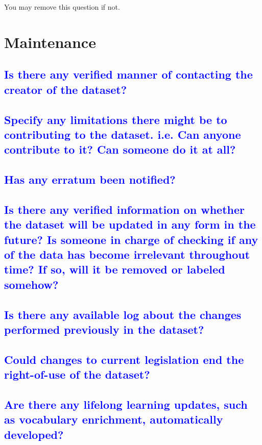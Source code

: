 \documentclass[letterpaper, 10 pt, conference]{ieeeconf}  %
\begin{document}
You may remove this question if not.
\\



\section{Maintenance}

\textcolor{blue}{\subsection{Is there any verified manner of contacting the creator of the dataset?}}
\lipsum[1]

\textcolor{blue}{\subsection{Specify any limitations there might be to contributing to the dataset. i.e. Can anyone contribute to it? Can someone do it at all?}}
\lipsum[1]

\textcolor{blue}{\subsection{Has any erratum been notified?}}
\lipsum[1]

\textcolor{blue}{\subsection{Is there any verified information on whether the dataset will be updated in any form in the future? Is someone in charge of checking if any of the data has become irrelevant throughout time? If so, will it be removed or labeled somehow?}}
\lipsum[1]

\textcolor{blue}{\subsection{Is there any available log about the changes performed previously in the dataset?}}
\lipsum[1]

\textcolor{blue}{\subsection{Could changes to current legislation end the right-of-use of the dataset?}}
\lipsum[1]

\textcolor{blue}{\subsection{Are there any lifelong learning updates, such as vocabulary enrichment, automatically developed?}}
\lipsum[1]
\end{document}
